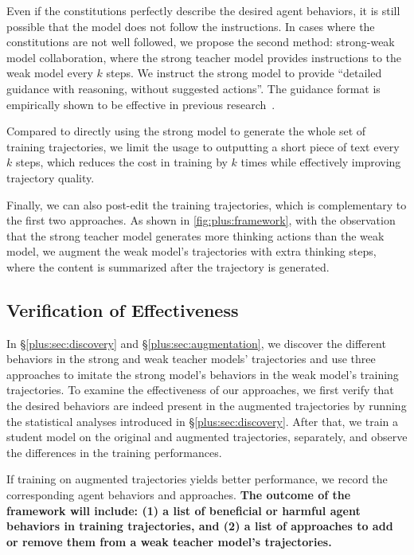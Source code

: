 Even if the constitutions perfectly describe the desired agent behaviors, it is still possible that the model does not follow the instructions.
In cases where the constitutions are not well followed, we propose the second method: strong-weak model collaboration, where the strong teacher model provides instructions to the weak model every $k$ steps.
We instruct the strong model to provide ``detailed guidance with reasoning, without suggested actions''. The guidance format is empirically shown to be effective in previous research~\cite{swe-prm}.

Compared to directly using the strong model to generate the whole set of training trajectories, we limit the usage to outputting a short piece of text every $k$ steps, which reduces the cost in training by $k$ times while effectively improving trajectory quality.

Finally, we can also post-edit the training trajectories, which is complementary to the first two approaches. 
As shown in \autoref{fig:plus:framework}, with the observation that the strong teacher model generates more thinking actions than the weak model, we augment the weak model's trajectories with extra thinking steps, where the content is summarized after the trajectory is generated.





\subsection{Verification of Effectiveness}
\label{plus:sec:verification}
In \S\ref{plus:sec:discovery} and \S\ref{plus:sec:augmentation}, we discover the different behaviors in the strong and weak teacher models' trajectories and use three approaches to imitate the strong model's behaviors in the weak model's training trajectories.
To examine the effectiveness of our approaches, we first verify that the desired behaviors are indeed present in the augmented trajectories by running the statistical analyses introduced in \S\ref{plus:sec:discovery}.
After that, we train a student model on the original and augmented trajectories, separately, and observe the differences in the training performances.

If training on augmented trajectories yields better performance, we record the corresponding agent behaviors and approaches.
\textbf{The outcome of the \plusname framework will include: (1) a list of beneficial or harmful agent behaviors in training trajectories, and (2) a list of approaches to add or remove them from a weak teacher model's trajectories.}

